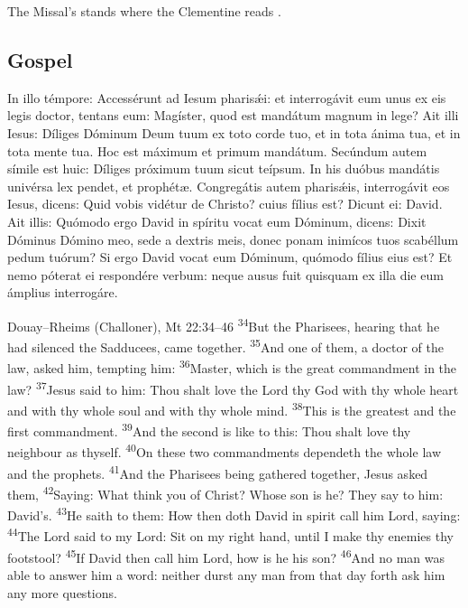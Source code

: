 \noindent The Missal's  stands where the Clementine reads
.

\subsection{Gospel}
\label{proper-gospel}


\begin{latinproper}
In illo témpore: Accessérunt ad Iesum pharisǽi: et interrogávit eum unus ex
eis legis doctor, tentans eum: Magíster, quod est mandátum magnum in lege? Ait
illi Iesus: Díliges Dóminum Deum tuum ex toto corde tuo, et in tota ánima tua,
et in tota mente tua. Hoc est máximum et primum mandátum. Secúndum autem símile
est huic: Díliges próximum tuum sicut teípsum. In his duóbus mandátis univérsa
lex pendet, et prophétæ. Congregátis autem pharisǽis, interrogávit eos Iesus,
dicens: Quid vobis vidétur de Christo? cuius fílius est? Dicunt ei: David. Ait
illis: Quómodo ergo David in spíritu vocat eum Dóminum, dicens: Dixit Dóminus
Dómino meo, sede a dextris meis, donec ponam inimícos tuos scabéllum pedum
tuórum? Si ergo David vocat eum Dóminum, quómodo fílius eius est? Et nemo
póterat ei respondére verbum: neque ausus fuit quisquam ex illa die eum
ámplius interrogáre.
\end{latinproper}

\begin{englishwitness}{Douay--Rheims (Challoner), Mt 22:34--46}
\textsuperscript{34}But the Pharisees, hearing that he had silenced the
Sadducees, came together. \textsuperscript{35}And one of them, a doctor of the
law, asked him, tempting him: \textsuperscript{36}Master, which is the great
commandment in the law? \textsuperscript{37}Jesus said to him: Thou shalt love
the Lord thy God with thy whole heart and with thy whole soul and with thy
whole mind. \textsuperscript{38}This is the greatest and the first commandment.
\textsuperscript{39}And the second is like to this: Thou shalt love thy
neighbour as thyself. \textsuperscript{40}On these two commandments dependeth
the whole law and the prophets. \textsuperscript{41}And the Pharisees being
gathered together, Jesus asked them, \textsuperscript{42}Saying: What think you
of Christ? Whose son is he? They say to him: David's. \textsuperscript{43}He
saith to them: How then doth David in spirit call him Lord, saying:
\textsuperscript{44}The Lord said to my Lord: Sit on my right hand, until I
make thy enemies thy footstool? \textsuperscript{45}If David then call him
Lord, how is he his son? \textsuperscript{46}And no man was able to answer him
a word: neither durst any man from that day forth ask him any more
questions.
\end{englishwitness}

